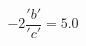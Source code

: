 \documentclass[preview]{standalone}
\begin{document}
\begin{align*}
-2 \dfrac{'b'}{'c'}= 5.0
\end{align*}
\end{document}
